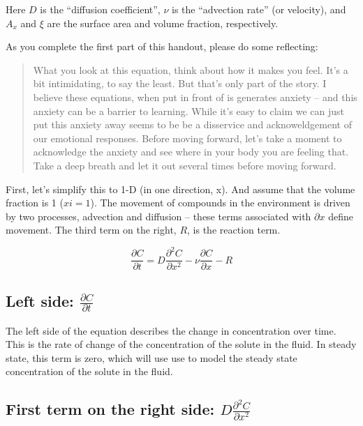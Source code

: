 \documentclass{tufte-handout}\usepackage[]{graphicx}\usepackage[]{xcolor}
\begin{document}
Here $D$ is the ``diffusion coefficient'', $\nu$ is the ``advection rate'' (or velocity), and $A_x$ and $\xi$ are the surface area and volume fraction, respectively.

As you complete the first part of this handout, please do some reflecting: 

\begin{quote}

What you look at this equation, think about how it makes you feel. It's a bit intimidating, to say the least. But that's only part of the story. I believe these equations, when put in front of is generates anxiety -- and this anxiety can be a barrier to learning. While it's easy to claim we can just put this anxiety away seems to be be a disservice and acknoweldgement of our emotional responses. Before moving forward, let's take a moment to acknowledge the anxiety and see where in your body you are feeling that. Take a deep breath and let it out several times before moving forward.

\end{quote} 

First, let's simplify this to 1-D (in one direction, x). And assume that the volume fraction is 1 ($xi = 1$). The movement of compounds in the environment is driven by two processes, advection and diffusion -- these terms associated with $\partial x$ define movement. The third term on the right, $R$, is the reaction term.

\begin{equation}
\frac{\partial C}{\partial t} = D \frac{\partial^2 C}{\partial x^2} - \nu \frac{\partial C}{\partial x} - R
\end{equation}

\subsection{Left side: $\frac{\partial C}{\partial t}$}

The left side of the equation describes the change in concentration over time. This is the rate of change of the concentration of the solute in the fluid. In steady state, this term is zero, which will use use to model the steady state concentration of the solute in the fluid.

\subsection{First term on the right side: $D \frac{\partial^2 C}{\partial x^2}$}
\end{document}

